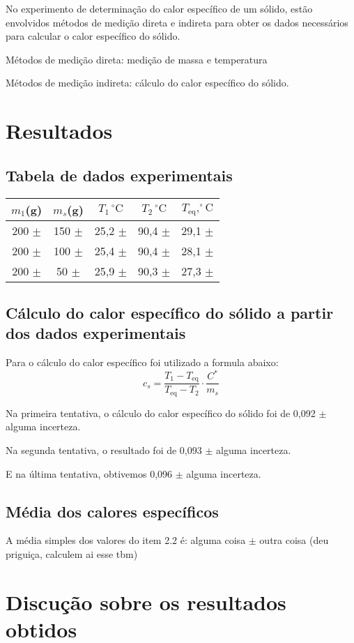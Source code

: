 \documentclass{article}
\begin{document}
\begin{multicols}{2}
No experimento de determinação do calor específico de um sólido, estão envolvidos métodos de medição direta e indireta para obter os dados necessários para calcular o calor específico do sólido.

Métodos de medição direta: medição de massa e temperatura

Métodos de medição indireta: cálculo do calor específico do sólido.

\section{Resultados}
\subsection{Tabela de dados experimentais}

\begin{minipage}{\linewidth}
\centering
\begin{tabular}{|c|c|c|c|c|}
    \hline
    $m_1$(g) & $m_s$(g) & $T_1\,^{\circ}\mathrm{C}$    & $T_2\,^{\circ}\mathrm{C}$ &$T_{\text{eq}},^{\circ}\mathrm{C}$ \\
    \hline
    200 $\pm$ & 150 $\pm$   & 25,2 $\pm$  & 90,4 $\pm$  & 29,1 $\pm$   \\
    \hline
    200 $\pm$  & 100 $\pm$  & 25,4 $\pm$  & 90,4 $\pm$  & 28,1 $\pm$   \\
    \hline
    200 $\pm$ & 50 $\pm$   & 25,9 $\pm$  & 90,3 $\pm$  & 27,3 $\pm$    \\
    \hline
\end{tabular}
\end{minipage}

\subsection{Cálculo do calor específico do sólido a partir dos dados experimentais}
Para o cálculo do calor específico foi utilizado a formula abaixo:
\begin{equation}
    c_s = \frac{{T_1 - T_{\text{eq}}}}{{T_{\text{eq}} - T_2}} \cdot \frac{C^*}{m_s}
    \end{equation}
    
Na primeira tentativa, o cálculo do calor específico do sólido foi de 0,092 $\pm$ alguma incerteza.

Na segunda tentativa, o resultado foi de 0,093 $\pm$ alguma incerteza.

E na última tentativa, obtivemos 0,096 $\pm$ alguma incerteza.

\subsection{Média dos calores específicos}

A média simples dos valores do item 2.2 é: alguma coisa $\pm$ outra coisa (deu priguiça, calculem ai esse tbm)

\section{Discução sobre os resultados obtidos}

\end{multicols}
\end{document}
